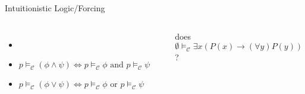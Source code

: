\documentclass{beamer}
\begin{document}
\begin{frame}{Intuitionistic Logic/Forcing}
\begin{columns}
{\begin{itemize}
\item    \textbf{}\\

\item    \textcolor{black!30}{$ p \vDash_{\mathcal{C}} (\phi \land \psi)    \Leftrightarrow p \vDash_{\mathcal{C}} \phi \text{ and } p \vDash_{\mathcal{C}} \psi$}\\

\item    \textcolor{black!30}{$ p \vDash_{\mathcal{C}} (\phi \lor \psi)     \Leftrightarrow p \vDash_{\mathcal{C}} \phi$ or $p \vDash_{\mathcal{C}} \psi$}\\


    \end{itemize}
}

    \rule{0.2mm}{\textheight} %

    \scriptsize{does $\emptyset \vDash_{\mathcal{C}} \exists x (P(x) \to (\forall y)P(y))$ } ?
    \newline
    \forcingExampleii
    

\end{columns}
\end{frame}
\end{document}
